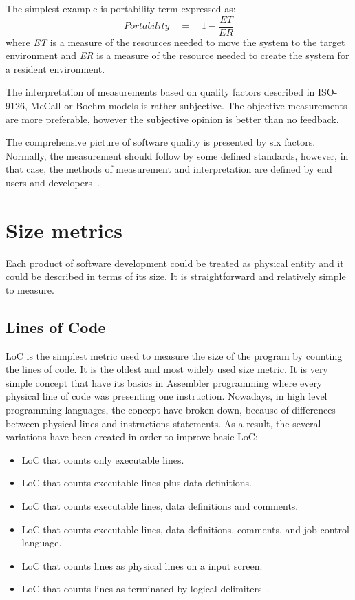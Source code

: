 The simplest example is portability term expressed as:
\begin{equation}
Portability\quad =\quad 1-\frac { ET }{ ER } 
\end{equation} 
where \textit{ET} is a measure of the resources needed to move the system to the target environment and \textit{ER} is a measure of the resource needed to create the system for a resident environment. 

The interpretation of measurements based on quality factors described in ISO-9126, McCall or Boehm models is rather subjective. The objective measurements are more preferable, however the subjective opinion is better than no feedback.  

The comprehensive picture of software quality is presented by six factors. Normally, the measurement should follow  by some defined standards, however, in that case, the methods of measurement and interpretation are defined by end users and developers~\cite{rigorous}.

\section{Size metrics}

Each product of software development could be treated as physical entity and it could be described in terms of its size. It is straightforward and relatively simple to measure. 

\subsection{Lines of Code}
\ac{LoC} is the simplest metric used to measure the size of the program by counting the lines of code. It is the oldest and most widely used size metric. It is very simple concept that have its basics in Assembler programming where every physical line of code was presenting  one instruction. Nowadays, in high level programming languages, the concept have broken down, because of differences between physical lines and instructions statements. As a result, the several variations have been created in order to improve basic \ac{LoC}:

\begin{itemize}
\item \ac{LoC} that counts only executable lines.
\item \ac{LoC} that counts executable lines plus data definitions.
\item \ac{LoC} that counts executable lines, data definitions and comments.
\item \ac{LoC} that counts executable lines, data definitions, comments, and job control language.
\item \ac{LoC} that counts lines as physical lines on a input screen.
\item \ac{LoC} that counts lines as terminated by logical delimiters~\cite{metrics}.
\end{itemize}

